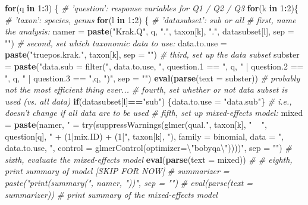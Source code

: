 \documentclass[
]{article}
\newenvironment{Shaded}{\begin{snugshade}}{\end{snugshade}}
\newcommand{\CharTok}[1]{\textcolor[rgb]{0.31,0.60,0.02}{#1}}
\newcommand{\CommentTok}[1]{\textcolor[rgb]{0.56,0.35,0.01}{\textit{#1}}}
\newcommand{\ControlFlowTok}[1]{\textcolor[rgb]{0.13,0.29,0.53}{\textbf{#1}}}
\newcommand{\DataTypeTok}[1]{\textcolor[rgb]{0.13,0.29,0.53}{#1}}
\newcommand{\DecValTok}[1]{\textcolor[rgb]{0.00,0.00,0.81}{#1}}
\newcommand{\KeywordTok}[1]{\textcolor[rgb]{0.13,0.29,0.53}{\textbf{#1}}}
\newcommand{\NormalTok}[1]{#1}
\newcommand{\OperatorTok}[1]{\textcolor[rgb]{0.81,0.36,0.00}{\textbf{#1}}}
\newcommand{\StringTok}[1]{\textcolor[rgb]{0.31,0.60,0.02}{#1}}
\begin{document}
\begin{Shaded}
\begin{Highlighting}[]
\ControlFlowTok{for}\NormalTok{(q }\ControlFlowTok{in} \DecValTok{1}\OperatorTok{:}\DecValTok{3}\NormalTok{) \{ }\CommentTok{# 'question': response variables for Q1 / Q2 / Q3}
    \ControlFlowTok{for}\NormalTok{(k }\ControlFlowTok{in} \DecValTok{1}\OperatorTok{:}\DecValTok{2}\NormalTok{)\{ }\CommentTok{# 'taxon': species, genus}
      \ControlFlowTok{for}\NormalTok{(l }\ControlFlowTok{in} \DecValTok{1}\OperatorTok{:}\DecValTok{2}\NormalTok{) \{ }\CommentTok{# 'datasubset': sub or all}
        \CommentTok{# first, name the analysis:}
\NormalTok{        namer =}\StringTok{ }\KeywordTok{paste}\NormalTok{(}\StringTok{"Krak.Q"}\NormalTok{, q, }\StringTok{"."}\NormalTok{, taxon[k], }\StringTok{"."}\NormalTok{, datasubset[l], }\DataTypeTok{sep =} \StringTok{""}\NormalTok{)}
        \CommentTok{# second, set which taxonomic data to use:}
\NormalTok{        data.to.use =}\StringTok{ }\KeywordTok{paste}\NormalTok{(}\StringTok{"truepos.krak."}\NormalTok{, taxon[k], }\DataTypeTok{sep =} \StringTok{""}\NormalTok{)}
        \CommentTok{# third, set up the data subset}
\NormalTok{        subster =}\StringTok{ }\KeywordTok{paste}\NormalTok{(}\StringTok{"data.sub = filter("}\NormalTok{, data.to.use, }\StringTok{", question.1 == "}\NormalTok{, q, }\StringTok{" | question.2 == "}\NormalTok{, q, }\StringTok{" | question.3 == "}\NormalTok{,q, }\StringTok{")"}\NormalTok{, }\DataTypeTok{sep =} \StringTok{""}\NormalTok{)}
        \KeywordTok{eval}\NormalTok{(}\KeywordTok{parse}\NormalTok{(}\DataTypeTok{text =}\NormalTok{ subster)) }\CommentTok{# probably not the most efficient thing ever... }
        \CommentTok{# fourth, set whether or not data subset is used (vs. all data)}
        \ControlFlowTok{if}\NormalTok{(datasubset[l]}\OperatorTok{==}\StringTok{"sub"}\NormalTok{) \{data.to.use =}\StringTok{ "data.sub"}\NormalTok{\} }\CommentTok{# i.e., doesn't change if all data are to be used}
        \CommentTok{# fifth, set up mixed-effects model: }
\NormalTok{        mixed =}\StringTok{ }\KeywordTok{paste}\NormalTok{(namer, }\StringTok{" = try(suppressWarnings(glmer(qual."}\NormalTok{, taxon[k],}
          \StringTok{" ~ "}\NormalTok{,  question[q], }\StringTok{" + (1|mix.ID) + (1|"}\NormalTok{, taxon[k], }\StringTok{"), family = binomial, }
\StringTok{          data = "}\NormalTok{, data.to.use, }\StringTok{", control = glmerControl(optimizer=}\CharTok{\textbackslash{}"}\StringTok{bobyqa}\CharTok{\textbackslash{}"}\StringTok{))))"}\NormalTok{, }\DataTypeTok{sep =} \StringTok{""}\NormalTok{)}
        \CommentTok{# sixth, evaluate the mixed-effects model}
        \KeywordTok{eval}\NormalTok{(}\KeywordTok{parse}\NormalTok{(}\DataTypeTok{text =}\NormalTok{ mixed))}
            \CommentTok{# # eighth, print summary of model [SKIP FOR NOW]}
            \CommentTok{# summarizer = paste("print(summary(", namer, "))", sep = "")}
            \CommentTok{# eval(parse(text = summarizer)) # print summary of the mixed-effects model}
        

\end{Highlighting}
\end{Shaded}
\end{document}
